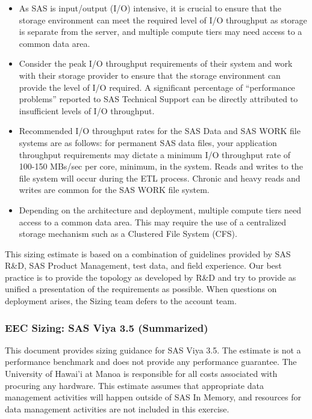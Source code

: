 \begin{enumerate}
    \begin{itemize}
        \item As SAS is input/output (I/O) intensive, it is crucial to ensure that the storage environment can meet the required level of I/O throughput as storage is separate from the server, and multiple compute tiers may need access to a common data area. 
        \item Consider the peak I/O throughput requirements of their system and work with their storage provider to ensure that the storage environment can provide the level of I/O required. A significant percentage of “performance problems” reported to SAS Technical Support can be directly attributed to insufficient levels of I/O throughput.
        \item Recommended I/O throughput rates for the SAS Data and SAS WORK file systems are as follows: for permanent SAS data files, your application throughput requirements may dictate a minimum I/O throughput rate of 100-150 MBs/sec per core, minimum, in the system. Reads and writes to the file system will occur during the ETL process. Chronic and heavy reads and writes are common for the SAS WORK file system. 
        \item Depending on the architecture and deployment, multiple compute tiers need access to a common data area. This may require the use of a centralized storage mechanism such as a Clustered File System (CFS).
    \end{itemize}
\end{enumerate}

This sizing estimate is based on a combination of guidelines provided by SAS R\&D, SAS Product Management, test data, and field experience. Our best practice is to provide the topology as developed by R\&D and try to provide as unified a presentation of the requirements as possible. When questions on deployment arises, the Sizing team defers to the account team.

\subsubsection{EEC Sizing: SAS Viya 3.5 (Summarized)}

This document provides sizing guidance for SAS Viya 3.5. The estimate is not a performance benchmark and does not provide any performance guarantee. The University of Hawai’i at Manoa is responsible for all costs associated with procuring any hardware. This estimate assumes that appropriate data management activities will happen outside of SAS In Memory, and resources for data management activities are not included in this exercise.

